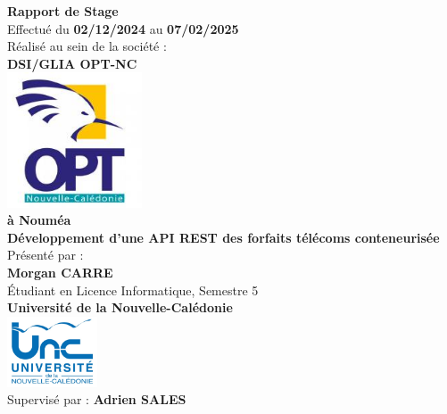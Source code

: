 \documentclass[11pt]{article}
\begin{document}
		
		\begin{titlepage}
			\begin{center}
				{\LARGE \textbf{Rapport de Stage}} \\[1cm]
				{\large Effectué du \textbf{02/12/2024} au \textbf{07/02/2025}} \\[1cm]
				
				
				
				{\large Réalisé au sein de la société :} \\[1cm]
				{\Large \textbf{DSI/GLIA OPT-NC}} \\[1cm]
				
				\includegraphics[width=0.3\textwidth]{asset/logo_opt.jpg} \\[1cm] 
				
				
				\textbf{à Nouméa} \\[1cm]
				
				{\large \textbf{Développement d'une API REST des forfaits télécoms conteneurisée}} \\[0.5cm]
				
				{\large Présenté par :} \\[1cm]
				{\LARGE \textbf{Morgan CARRE}} \\[0.3cm]
				Étudiant en Licence Informatique, Semestre 5 \\[0.3cm]
				\textbf{Université de la Nouvelle-Calédonie} \\[0.3cm]
				
				\includegraphics[width=0.2\textwidth]{asset/logo_universite.jpg} \\[2cm]
				
				{\large Supervisé par : \textbf{Adrien SALES}} \\[0.3cm]
			\end{center}
		\end{titlepage}
		
\end{document}
